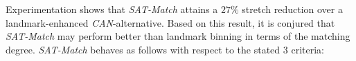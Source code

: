 Experimentation shows that \emph{SAT-Match} 
attains a $27\%$ stretch reduction over 
a landmark-enhanced \emph{CAN}-alternative.
Based on this result, it is conjured that \emph{SAT-Match} 
may perform better than landmark binning in terms of the matching degree. 
\emph{SAT-Match} behaves as follows with respect to the stated $3$ criteria:
%
%
%
%
